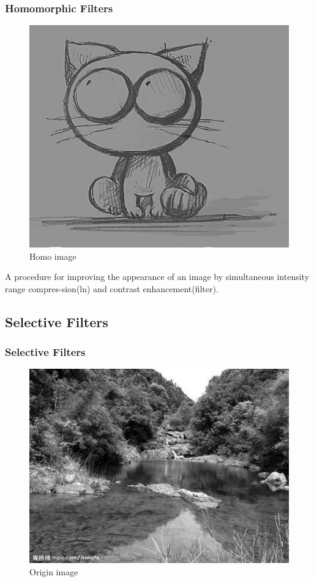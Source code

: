 \documentclass[notheorems, serif, table, compress]{beamer}  %
\begin{document}
\begin{frame}
\frametitle{Homomorphic Filters}%
\begin{figure}
 \centering
 \caption{Homo image}
 \includegraphics[width=0.5\linewidth]{homo.png} 
 \end{figure}
A procedure for improving the appearance of an image by simultaneous intensity range compres-sion(ln) and contrast enhancement(filter).
 \end{frame}

\subsection{Selective Filters}%

\begin{frame}
\frametitle{Selective Filters}
\begin{figure}
 \centering
 \caption{Origin image}
 \includegraphics[width=0.8\linewidth]{orgn.png} 
 \end{figure}
\end{frame}
\end{document}
